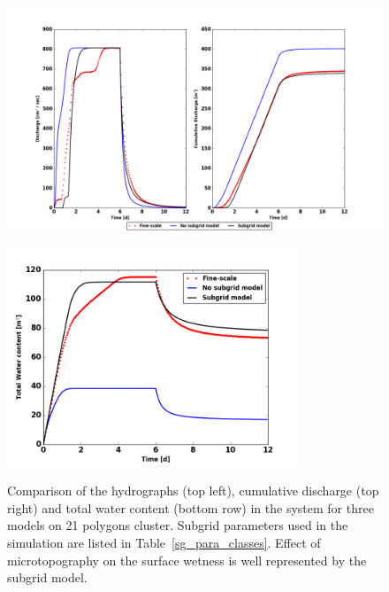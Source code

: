 \begin{figure}[!h]
\hskip -1.6cm  \includegraphics[width=15.cm, height=7.5cm]{./figures/new-model/discharge-Srun5SG_F.png} \\
\includegraphics[width=10.cm, height=6.5cm]{./figures/new-model/Watercontent-Srun5SG_F.png}
\caption{Comparison of the hydrographs (top left), cumulative discharge (top right) and total water content (bottom row) in the system for three models on 21 polygons cluster. Subgrid parameters used in the simulation are listed in Table~\ref{sg_para_classes}. Effect of microtopography on the surface wetness is well represented by the subgrid model.}
\label{lobster-comparison-rainfall}
\end{figure}

